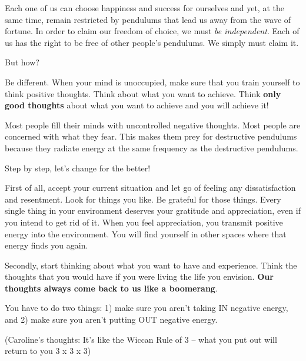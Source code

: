 \documentclass[
  openany]{book}
\begin{document}
Each one of us can choose happiness and success for ourselves and yet, at the same time, remain restricted by pendulums that lead us away from the wave of fortune. In order to claim our freedom of choice, we must \emph{be independent}. Each of us has the right to be free of other people's pendulums. We simply must claim it.

But how?

Be different. When your mind is unoccupied, make sure that you train yourself to think positive thoughts. Think about what you want to achieve. Think \textbf{only good thoughts} about what you want to achieve and you will achieve it!

Most people fill their minds with uncontrolled negative thoughts. Most people are concerned with what they fear. This makes them prey for destructive pendulums because they radiate energy at the same frequency as the destructive pendulums.

Step by step, let's change for the better!

First of all, accept your current situation and let go of feeling any dissatisfaction and resentment. Look for things you like. Be grateful for those things. Every single thing in your environment deserves your gratitude and appreciation, even if you intend to get rid of it. When you feel appreciation, you transmit positive energy into the environment. You will find yourself in other spaces where that energy finds you again.

Secondly, start thinking about what you want to have and experience. Think the thoughts that you would have if you were living the life you envision. \textbf{Our thoughts always come back to us like a boomerang}.

You have to do two things:
1) make sure you aren't taking IN negative energy, and
2) make sure you aren't putting OUT negative energy.

(Caroline's thoughts: It's like the Wiccan Rule of 3 -- what you put out will return to you 3 x 3 x 3)
\end{document}
